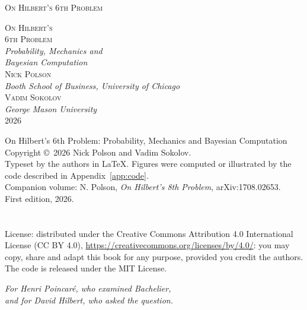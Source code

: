 \documentclass[11pt,twoside,openright]{book}
\makeatletter
\def\cleardoublepage{\clearpage\if@twoside \ifodd\c@page\else
  \hbox{}\thispagestyle{empty}\newpage\if@twocolumn\hbox{}\newpage\fi\fi\fi}
\theoremstyle{scplain}
\theoremstyle{scdef}
\makeatother
\begin{document}
\frontmatter
\pagestyle{empty}

\begin{center}
\vspace*{2.2in}
{\LARGE\scshape On Hilbert's 6th Problem}
\end{center}
\cleardoublepage

\begin{center}
\vspace*{1.3in}
{\Huge\scshape On Hilbert's}\\[0.4em]
{\Huge\scshape 6th Problem}\\[1.6em]
{\large\itshape Probability, Mechanics and}\\[0.2em]
{\large\itshape Bayesian Computation}\\[3.2em]
{\large\scshape Nick Polson}\\[0.4em]
{\normalsize\itshape Booth School of Business, University of Chicago}\\[1.4em]
{\large\scshape Vadim Sokolov}\\[0.4em]
{\normalsize\itshape George Mason University}\\
\vfill
{\small 2026}
\end{center}
\newpage

\vspace*{\fill}
{\small
\noindent On Hilbert's 6th Problem: Probability, Mechanics and Bayesian Computation\\[0.6em]
Copyright \copyright\ 2026 Nick Polson and Vadim Sokolov.\\[0.6em]
Typeset by the authors in \LaTeX. Figures were computed or illustrated by the code described in Appendix~\ref{app:code}.\\[0.6em]
Companion volume: N. Polson, \emph{On Hilbert's 8th Problem}, arXiv:1708.02653.\\[0.6em]
First edition, 2026.%
\ifx\BookISBNline\empty\else\\[0.6em]\BookISBNline\fi
\ifx\BookDOIline\empty\else\\[0.6em]\BookDOIline\fi
\\[0.6em]License: distributed under the Creative Commons Attribution 4.0 International License (CC BY 4.0), \url{https://creativecommons.org/licenses/by/4.0/}: you may copy, share and adapt this book for any purpose, provided you credit the authors. The code is released under the MIT License.
}
\newpage

\vspace*{2.2in}
\begin{center}
\itshape
For Henri Poincar\'e, who examined Bachelier,\\
and for David Hilbert, who asked the question.
\end{center}
\cleardoublepage
\end{document}
